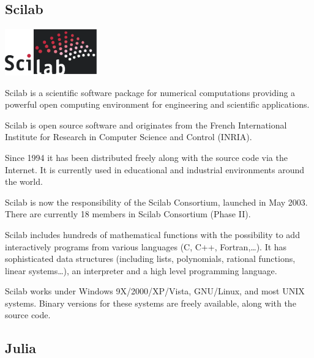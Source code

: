 \subsection{Scilab}

\begin{floatingfigure}[r]{4cm}
\centering
\includegraphics[width=4cm]{figures/scilab_official_logo}
\end{floatingfigure}

Scilab is a scientific software package for numerical computations providing a
powerful open computing environment for engineering and scientific
applications.

Scilab is open source software and originates from the French International
Institute for Research in Computer Science and Control (INRIA).

Since 1994 it has been distributed freely along with the source code via the
Internet. It is currently used in educational and industrial environments
around the world.

Scilab is now the responsibility of the Scilab Consortium, launched in May
2003. There are currently 18 members in Scilab Consortium (Phase II).

Scilab includes hundreds of mathematical functions with the possibility to add
interactively programs from various languages (C, C++, Fortran,\dots). It has
sophisticated data structures (including lists, polynomials, rational
functions, linear systems\dots), an interpreter and a high level programming
language.

Scilab works under Windows 9X/2000/XP/Vista, GNU/Linux, and most UNIX systems.
Binary versions for these systems are freely available, along with the source
code.

\subsection{Julia}

